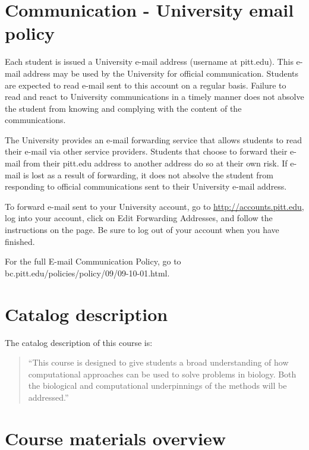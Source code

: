 \documentclass[
]{book}
\begin{document}
\hypertarget{communication---university-email-policy}{%
\chapter{Communication - University email policy}\label{communication---university-email-policy}}

Each student is issued a University e-mail address (username at pitt.edu). This e-mail address may be used by the University for official communication. Students are expected to read e-mail sent to this account on a regular basis. Failure to read and react to University communications in a timely manner does not absolve the student from knowing and complying with the content of the communications.

The University provides an e-mail forwarding service that allows students to read their e-mail via other service providers. Students that choose to forward their e-mail from their pitt.edu address to another address do so at their own risk. If e-mail is lost as a result of forwarding, it does not absolve the student from responding to official communications sent to their University e-mail address.

To forward e-mail sent to your University account, go to \url{http://accounts.pitt.edu}, log into your account, click on Edit Forwarding Addresses, and follow the instructions on the page. Be sure to log out of your account when you have finished.

For the full E-mail Communication Policy, go to bc.pitt.edu/policies/policy/09/09-10-01.html.

\hypertarget{catalog-description}{%
\chapter{Catalog description}\label{catalog-description}}

The catalog description of this course is:

\begin{quote}
``This course is designed to give students a broad understanding of how computational approaches can be used to solve problems in biology. Both the biological and computational underpinnings of the methods will be addressed.''
\end{quote}

\hypertarget{course-materials-overview}{%
\chapter{Course materials overview}\label{course-materials-overview}}
\end{document}
